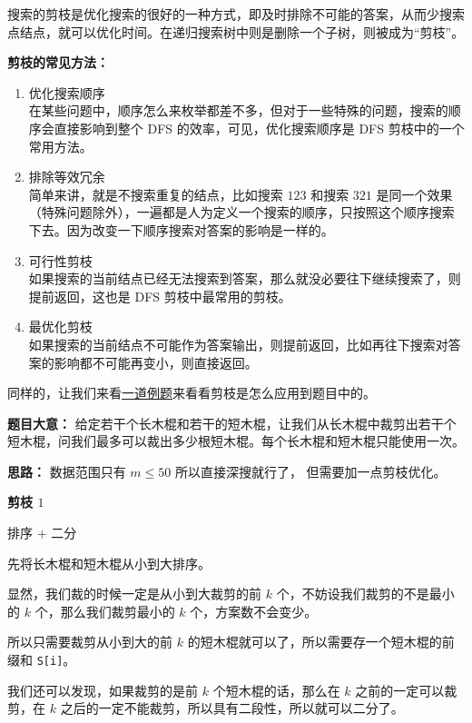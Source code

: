 搜索的剪枝是优化搜索的很好的一种方式，即及时排除不可能的答案，从而少搜索点结点，就可以优化时间。在递归搜索树中则是删除一个子树，则被成为“剪枝”。

\textbf{剪枝的常见方法：}

\begin{enumerate}
\item 优化搜索顺序\\
在某些问题中，顺序怎么来枚举都差不多，但对于一些特殊的问题，搜索的顺序会直接影响到整个 DFS 的效率，可见，优化搜索顺序是 DFS 剪枝中的一个常用方法。

\item 排除等效冗余 \\
简单来讲，就是不搜索重复的结点，比如搜索 $123$ 和搜索 $321$ 是同一个效果（特殊问题除外），一遍都是人为定义一个搜索的顺序，只按照这个顺序搜索下去。因为改变一下顺序搜索对答案的影响是一样的。

\item 可行性剪枝\\
如果搜索的当前结点已经无法搜索到答案，那么就没必要往下继续搜索了，则提前返回，这也是 DFS 剪枝中最常用的剪枝。

\item 最优化剪枝 \\
如果搜索的当前结点不可能作为答案输出，则提前返回，比如再往下搜索对答案的影响都不可能再变小，则直接返回。
\end{enumerate}

同样的，让我们来看\href{https://loj.ac/p/2148}{一道例题}来看看剪枝是怎么应用到题目中的。

\textbf{题目大意：}
给定若干个长木棍和若干的短木棍，让我们从长木棍中裁剪出若干个短木棍，问我们最多可以裁出多少根短木棍。每个长木棍和短木棍只能使用一次。

\textbf{思路：}
数据范围只有 $m\leq50$ 所以直接深搜就行了， 但需要加一点剪枝优化。


\textbf{剪枝 $1$}

排序 $+$ 二分 

先将长木棍和短木棍从小到大排序。

显然，我们裁的时候一定是从小到大裁剪的前 $k$ 个，不妨设我们裁剪的不是最小的 $k$ 个，那么我们裁剪最小的 $k$ 个，方案数不会变少。

所以只需要裁剪从小到大的前 $k$ 的短木棍就可以了，所以需要存一个短木棍的前缀和 \verb|S[i]|。

我们还可以发现，如果裁剪的是前 $k$ 个短木棍的话，那么在 $k$ 之前的一定可以裁剪，在 $k$ 之后的一定不能裁剪，所以具有二段性，所以就可以二分了。	

